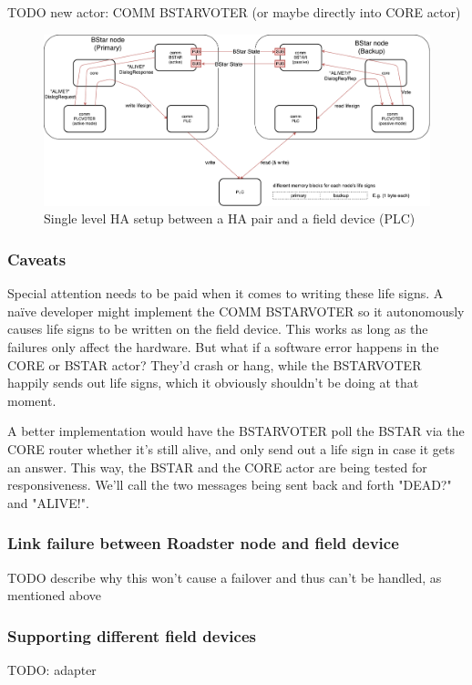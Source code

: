 TODO new actor: COMM BSTARVOTER (or maybe directly into CORE actor)

\begin{figure}[]
	\includegraphics[width=\textwidth]{img/SL-HA_bstar.pdf}
	\caption{Single level HA setup between a HA pair and a field device (PLC)}
	\label{fig:sl-ha}
\end{figure}

\subsubsection{Caveats}
Special attention needs to be paid when it comes to writing these life signs. A
na\"ive developer might implement the COMM BSTARVOTER so it autonomously causes
life signs to be written on the field device. This works as long as the failures only affect
the hardware. But what if a software error happens in the CORE or BSTAR actor?
They'd crash or hang, while the BSTARVOTER happily sends out life signs, which it
obviously shouldn't be doing at that moment.

A better implementation would have the BSTARVOTER poll the BSTAR via the CORE
router whether it's still alive, and only send out a life sign in case it gets
an answer. This way, the BSTAR and the CORE actor are being tested for
responsiveness. We'll call the two messages being sent back and forth "DEAD?"
and "ALIVE!".

\subsubsection{Link failure between Roadster node and field device}
TODO describe why this won't cause a failover and thus can't be handled, as
mentioned above\\

\subsubsection{Supporting different field devices}
TODO: adapter

